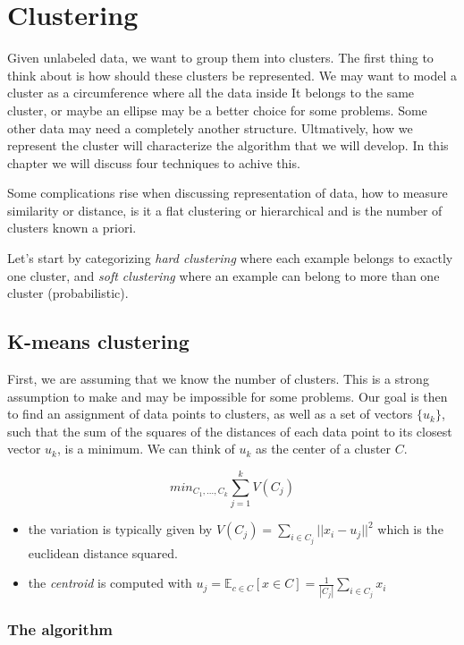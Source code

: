 \documentclass{article}
\begin{document}
\section{Clustering}\label{clustering}

Given unlabeled data, we want to group them into clusters. The first
thing to think about is how should these clusters be represented. We may
want to model a cluster as a circumference where all the data inside It
belongs to the same cluster, or maybe an ellipse may be a better choice
for some problems. Some other data may need a completely another
structure. Ultmatively, how we represent the cluster will characterize
the algorithm that we will develop. In this chapter we will discuss four
techniques to achive this.

Some complications rise when discussing representation of data, how to
measure similarity or distance, is it a flat clustering or hierarchical
and is the number of clusters known a priori.

Let's start by categorizing \emph{hard clustering} where each example
belongs to exactly one cluster, and \emph{soft clustering} where an
example can belong to more than one cluster (probabilistic).

\subsection{K-means clustering}\label{k-means-clustering}

First, we are assuming that we know the number of clusters. This is a
strong assumption to make and may be impossible for some problems. Our
goal is then to find an assignment of data points to clusters, as well
as a set of vectors \(\{u_k\}\), such that the sum of the squares of the
distances of each data point to its closest vector \(u_k\), is a
minimum. We can think of \(u_k\) as the center of a cluster \(C\).

\[min_{C_1, ..., C_k}\sum_{j=1}^kV(C_j)\]

\begin{itemize}
\tightlist
\item
  the variation is typically given by
  \(V(C_j) = \sum_{i\in C_j} ||x_i-u_j||^2\) which is the euclidean
  distance squared.
\item
  the \emph{centroid} is computed with
  \(u_j = \mathbb{E}_{c\in C}[x\in C] = \frac{1}{|C_j|}\sum_{i\in C_j} x_i\)
\end{itemize}

\subsubsection{The algorithm}\label{the-algorithm}
\end{document}
